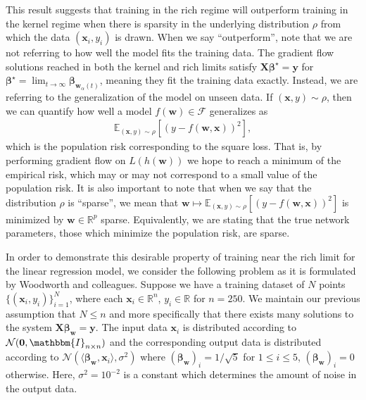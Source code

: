 \documentclass{article}
\begin{document}
This result suggests that training in the rich regime will outperform training in the kernel regime when there is sparsity in the underlying distribution $\rho$ from which the data $(\boldsymbol{x}_i, y_i)$ is drawn. When we say \enquote{outperform}, note that we are not referring to how well the model fits the training data. The gradient flow solutions reached in both the kernel and rich limits satisfy $\boldsymbol{X}\boldsymbol{\beta}^{\star} = \boldsymbol{y}$ for $\boldsymbol{\beta}^{\star} = \lim_{t \to \infty} \boldsymbol{\beta}_{\boldsymbol{w}_{\alpha}(t)}$, meaning they fit the training data exactly. Instead, we are referring to the generalization of the model on unseen data. If $(\boldsymbol{x}, y) \sim \rho$, then we can quantify how well a model $f(\boldsymbol{w}) \in \mathcal{F}$ generalizes as
\begin{align}\label{poprisk}
\mathbb{E}_{(\boldsymbol{x}, y) \sim \rho}[(y - f(\boldsymbol{w}, \boldsymbol{x}))^2],
\end{align}
which is the population risk corresponding to the square loss. That is, by performing gradient flow on $L(h(\boldsymbol{w}))$ we hope to reach a minimum of the empirical risk, which may or may not correspond to a small value of the population risk. It is also important to note that when we say that the distribution $\rho$ is \enquote{sparse}, we mean that $\boldsymbol{w} \mapsto \mathbb{E}_{(\boldsymbol{x}, y) \sim \rho}[(y - f(\boldsymbol{w}, \boldsymbol{x}))^2]$ is minimized by $\boldsymbol{w} \in \mathbb{R}^p$ sparse. Equivalently, we are stating that the true network parameters, those which minimize the population risk, are sparse. 

In order to demonstrate this desirable property of training near the rich limit for the linear regression model, we consider the following problem as it is formulated by Woodworth and colleagues. Suppose we have a training dataset of $N$ points $\{(\boldsymbol{x}_i, y_i)\}_{i=1}^N$, where each $\boldsymbol{x}_i \in \mathbb{R}^n$, $y_i \in \mathbb{R}$ for $n = 250$. We maintain our previous assumption that $N \leq n$ and more specifically that there exists many solutions to the system $\boldsymbol{X}\boldsymbol{\beta}_{\boldsymbol{w}} = \boldsymbol{y}$. The input data $\boldsymbol{x}_i$ is distributed according to $\mathcal{N}(\boldsymbol{0},\mathbbm{I}_{n \times n})$ and the corresponding output data is distributed according to $\mathcal{N}(\langle \boldsymbol{\beta}_{\boldsymbol{w}}, \boldsymbol{x}_i \rangle, \sigma^2)$ where $(\boldsymbol{\beta}_{\boldsymbol{w}})_i = 1/\sqrt{5}$ for $1 \leq i \leq 5$, $(\boldsymbol{\beta}_{\boldsymbol{w}})_i = 0$ otherwise. Here, $\sigma^2 = 10^{-2}$ is a constant which determines the amount of noise in the output data.
\end{document}
